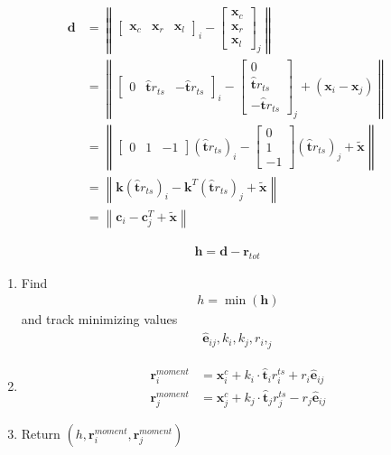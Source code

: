 \begin{align}
\mathbf{d} &= \left\|\begin{bmatrix} \mathbf{x}_{c} & \mathbf{x}_{r} & \mathbf{x}_{l} \end{bmatrix}_{i} - \begin{bmatrix} \mathbf{x}_{c} \\ \mathbf{x}_{r} \\ \mathbf{x}_{l} \end{bmatrix}_{j}\right\|
\\
&= \left\|\begin{bmatrix} 0 & \hat{\mathbf{t}} r_{ts} & -\hat{\mathbf{t}} r_{ts} \end{bmatrix}_{i} - \begin{bmatrix} 0 \\ \hat{\mathbf{t}} r_{ts} \\ -\hat{\mathbf{t}} r_{ts} \end{bmatrix}_{j}  + (\mathbf{x}_{i} - \mathbf{x}_{j}) \right\|
\\
&= \left\|\begin{bmatrix} 0 & 1 & -1 \end{bmatrix} \left(\hat{\mathbf{t}} r_{ts}\right)_{i} - \begin{bmatrix} 0 \\ 1 \\ -1 \end{bmatrix} \left(\hat{\mathbf{t}} r_{ts}\right)_{j}  + \tilde{\mathbf{x}} \right\|
\\
&= \left\| \mathbf{k} \left(\hat{\mathbf{t}} r_{ts}\right)_{i} - \mathbf{k}^{T} \left(\hat{\mathbf{t}} r_{ts}\right)_{j}  + \tilde{\mathbf{x}} \right\|
\\
&= \left\| \mathbf{c}_{i} - \mathbf{c}_{j}^{T}  + \tilde{\mathbf{x}} \right\|
\end{align}

\begin{align}
\mathbf{h} = \mathbf{d} - \mathbf{r}_{tot}
\end{align}

\begin{enumerate}
\item Find 
\begin{align}
h = \min(\mathbf{h})
\end{align}
and track minimizing values
\begin{align}
\hat{\mathbf{e}}_{ij}, k_{i}, k_{j}, r_{i}, _{j}
\end{align}

\item 

\begin{align}
\mathbf{r}_{i}^{moment} &= \mathbf{x}_{i}^{c} + k_{i} \cdot \hat{\mathbf{t}}_{i} r_{i}^{ts} + r_{i} \hat{\mathbf{e}}_{ij} \\
\mathbf{r}_{j}^{moment} &= \mathbf{x}_{j}^{c} + k_{j} \cdot \hat{\mathbf{t}}_{j} r_{j}^{ts} - r_{j} \hat{\mathbf{e}}_{ij}
\end{align}

\item Return $ (h, \mathbf{r}_{i}^{moment}, \mathbf{r}_{j}^{moment}) $

\end{enumerate}



